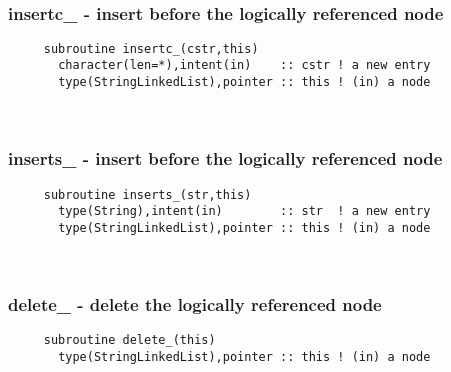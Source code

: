  
\mbox{}\hrulefill\ 
 
  \subsubsection{insertc\_ - insert before the logically referenced node}

\begin{verbatim} 
     subroutine insertc_(cstr,this)
       character(len=*),intent(in)    :: cstr ! a new entry
       type(StringLinkedList),pointer :: this ! (in) a node
 \end{verbatim}%
 
 
\mbox{}\hrulefill\ 
 
  \subsubsection{inserts\_ - insert before the logically referenced node}

\begin{verbatim} 
     subroutine inserts_(str,this)
       type(String),intent(in)        :: str  ! a new entry
       type(StringLinkedList),pointer :: this ! (in) a node
 \end{verbatim}%
 
 
\mbox{}\hrulefill\ 

  \subsubsection{delete\_ - delete the logically referenced node}

\begin{verbatim} 
     subroutine delete_(this)
       type(StringLinkedList),pointer :: this ! (in) a node
 \end{verbatim}%
 
